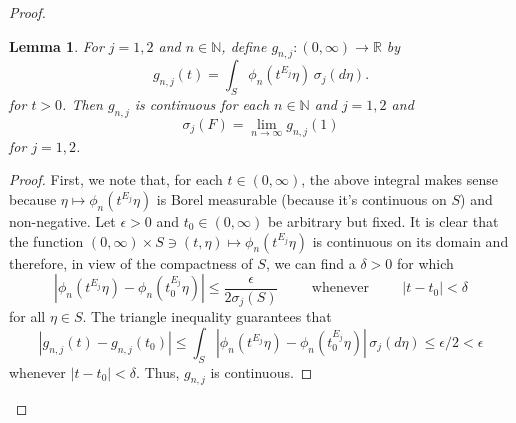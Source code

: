 \documentclass[11pt]{article}
\newtheorem{lemma}[theorem]{Lemma}
\newcommand*{\myproofname}{Proof}
\newenvironment{subproof}[1][\myproofname]{\begin{proof}[#1]\renewcommand*{\qedsymbol}{$\mathbin{/\mkern-6mu/}$}}{\end{proof}}
\begin{document}
\begin{proof}
\begin{lemma}\label{lem:IndepProof}
For $j=1,2$ and $n\in\mathbb{N}$, define $g_{n,j}:(0,\infty)\to\mathbb{R}$ by
\begin{equation*}
g_{n,j}(t)=\int_S\phi_n(t^{E_j}\eta)\,\sigma_j(d\eta).
\end{equation*}
for $t>0$. Then $g_{n,j}$ is continuous for each $n\in\mathbb{N}$ and $j=1,2$ and
\begin{equation*}
    \sigma_j(F)=\lim_{n\to\infty}g_{n,j}(1)
\end{equation*}
for $j=1,2$.
\end{lemma}
\begin{subproof}
First, we note that, for each $t\in (0,\infty)$, the above integral makes sense because $\eta\mapsto \phi_n(t^{E_j}\eta)$ is Borel measurable (because it's continuous on $S$) and non-negative. Let $\epsilon>0$ and $t_0\in (0,\infty)$ be arbitrary but fixed. It is clear that the function $(0,\infty)\times S\ni (t,\eta)\mapsto \phi_n(t^{E_j}\eta)$ is continuous on its domain and therefore, in view of the compactness of $S$, we can find a $\delta>0$ for which
\begin{equation*}
|\phi_n(t^{E_j}\eta)-\phi_n(t_0^{E_j}\eta)|\leq\frac{\epsilon}{2\sigma_j(S)}\hspace{1cm}\mbox{whenever}\hspace{1cm}|t-t_0|<\delta
\end{equation*}
for all $\eta\in S$. The triangle inequality guarantees that
\begin{equation*}
|g_{n,j}(t)-g_{n,j}(t_0)|\leq \int_S|\phi_n(t^{E_j}\eta)-\phi_n(t_0^{E_j}\eta)|\,\sigma_j(d \eta)\leq\epsilon/2<\epsilon
\end{equation*}
whenever $|t-t_0|<\delta$. Thus, $g_{n,j}$ is continuous.


\end{subproof}
\end{proof}
\end{document}
